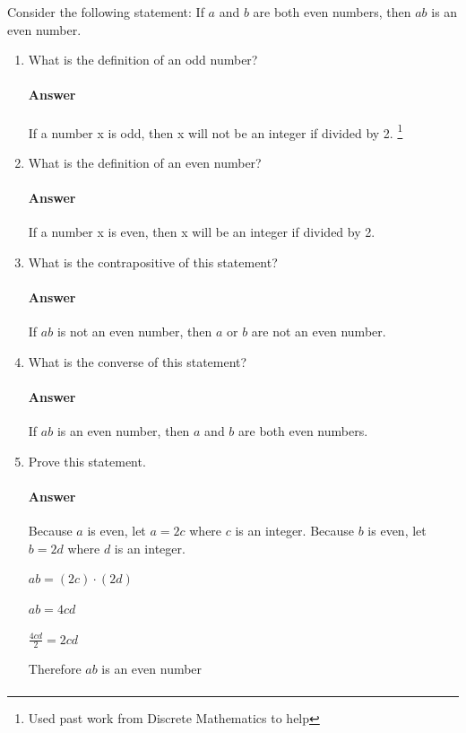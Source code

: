 \documentclass{article}
\begin{document}
\collab{}
Consider the following statement: If $a$ and $b$ are both even numbers, then $ab$ is
an even number.
\begin{enumerate}
      \item What is the definition of an odd number?
            
            \paragraph{Answer} If a number x is odd, then x will not be an integer if divided by 2.
            \footnote{Used past work from Discrete Mathematics to help}
            
      \item What is the definition of an even number?
            
            \paragraph{Answer} If a number x is even, then x will be an integer if divided by 2.
            
      \item What is the contrapositive of this statement?
            
            \paragraph{Answer} If $ab$ is not an even number, then $a$ or $b$ are not an even number.
            
      \item What is the converse of this statement?
            
            \paragraph{Answer} If $ab$ is an even number, then $a$ and $b$ are both even numbers.
            
      \item Prove this statement.
            
            \paragraph{Answer} Because $a$ is even, let $ a= 2c$ where $c$ is an integer.
            Because $b$ is even, let $ b= 2d$ where $d$ is an integer.
            
            $ab = (2c) \cdot (2d)$
            
            $ab = 4cd$
            
            $\frac{4cd}{2} = 2cd$
            
            Therefore $ab$ is an even number
            
            
            \paragraph{}
            
\end{enumerate}
\end{document}
